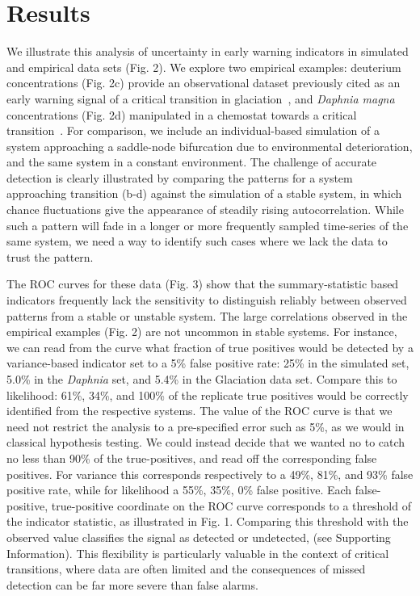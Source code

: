 \documentclass[authoryear,preprint,11pt]{elsarticle}
\begin{document}
\section{Results}

We illustrate this analysis of uncertainty in early warning indicators in simulated and empirical data sets (Fig. 2). 
We explore two empirical examples:
deuterium concentrations (Fig. 2c) provide an observational dataset previously cited as an early warning signal of a critical transition in glaciation~\citep{Dakos2008},
and \emph{Daphnia magna} concentrations (Fig. 2d) manipulated in a chemostat towards a critical transition~\citep{Drake2010}.  
For comparison, we include an individual-based simulation of a system approaching a saddle-node bifurcation due to environmental deterioration,
and the same system in a constant environment. 
The challenge of accurate detection is clearly illustrated by comparing the patterns for a system approaching transition (b-d) 
against the simulation of a stable system, in which chance fluctuations give the appearance of steadily rising autocorrelation. 
While such a pattern will fade in a longer or more frequently sampled time-series of the same system, 
we need a way to identify such cases where we lack the data to trust the pattern.  

The ROC curves for these data (Fig. 3) show that the summary-statistic based indicators 
frequently lack the sensitivity to distinguish reliably between observed patterns from a stable or unstable system. 
The large correlations observed in the empirical examples (Fig. 2) are not uncommon in stable systems. 
For instance, we can read from the curve what fraction of true positives would be detected by a variance-based indicator
set to a 5\% false positive rate:
25\% in the simulated set,
5.0\% in the \emph{Daphnia} set,
and 5.4\% in the Glaciation data set.
Compare this to likelihood: 61\%, 34\%, and 100\% of the replicate true positives
would be correctly identified from the respective systems.
The value of the ROC curve is that we need not restrict the analysis to a pre-specified error such as 5\%,
as we would in classical hypothesis testing.  
We could instead decide that we wanted no to catch no less than 90\% of the true-positives,
and read off the corresponding false positives.  
For variance this corresponds respectively to a 49\%, 81\%, and 93\% false positive rate,
while for likelihood a 55\%, 35\%, 0\% false positive.
Each false-positive, true-positive coordinate on the ROC curve corresponds to a threshold of the indicator statistic,
as illustrated in Fig. 1.  
Comparing this threshold with the observed value classifies the signal as detected or undetected, (see Supporting Information).
This flexibility is particularly valuable in the context of critical transitions, 
where data are often limited and the consequences of missed detection can be far more severe than false alarms.  
\end{document}
